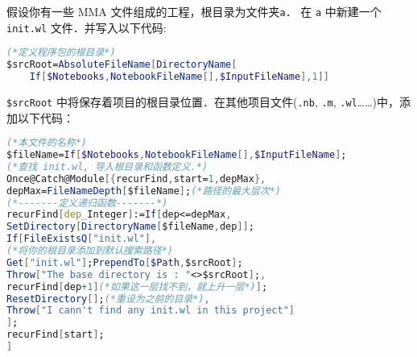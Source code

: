 假设你有一些 MMA 文件组成的工程，根目录为文件夹\verb`a`．
在 \verb`a` 中新建一个 \verb`init.wl` 文件．并写入以下代码:
\begin{lstlisting}[language=mathematica]
(*定义程序包的根目录*)
$srcRoot=AbsoluteFileName[DirectoryName[
    If[$Notebooks,NotebookFileName[],$InputFileName],1]]
\end{lstlisting}
\verb`$srcRoot` 中将保存着项目的根目录位置．在其他项目文件(\verb`.nb`, \verb`.m`, \verb`.wl`……)中，添加以下代码：
\begin{lstlisting}[language=mathematica]
(*本文件的名称*)
$fileName=If[$Notebooks,NotebookFileName[],$InputFileName];
(*查找 init.wl, 导入根目录和函数定义.*)
Once@Catch@Module[{recurFind,start=1,depMax},
depMax=FileNameDepth[$fileName];(*路径的最大层次*)
(*-------定义递归函数-------*)
recurFind[dep_Integer]:=If[dep<=depMax,
SetDirectory[DirectoryName[$fileName,dep]];
If[FileExistsQ["init.wl"],
(*将你的根目录添加到默认搜索路径*)
Get["init.wl"];PrependTo[$Path,$srcRoot];
Throw["The base directory is : "<>$srcRoot];,
recurFind[dep+1](*如果这一层找不到，就上升一层*)];
ResetDirectory[];(*重设为之前的目录*),
Throw["I cann't find any init.wl in this project"]
];
recurFind[start];
]
\end{lstlisting}